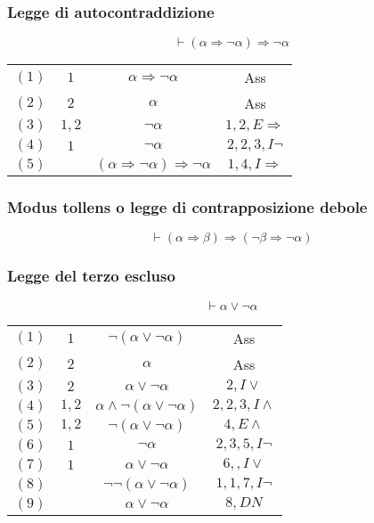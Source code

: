 \subsubsection{Legge di autocontraddizione}
\begin{equation}
\vdash(\alpha\Rightarrow\neg\alpha)\Rightarrow\neg\alpha
\end{equation}
\begin{tabular}{c c c c}
$(1)$& $1$ & $\alpha\Rightarrow\neg\alpha$ & Ass\\
$(2)$& $2$ & $\alpha$ & Ass\\
$(3)$ & $1, 2$ & $\neg\alpha$& $1,2, E\Rightarrow$\\
$(4)$ & $1$ & $\neg\alpha$ & $2,2, 3, I\neg$\\
$(5)$ &  & $(\alpha\Rightarrow\neg\alpha)\Rightarrow\neg\alpha$ & $1,4,I\Rightarrow$\\
\end{tabular}
\subsubsection{Modus tollens o legge di contrapposizione debole}
\begin{equation}
\vdash (\alpha\Rightarrow\beta)\Rightarrow(\neg\beta\Rightarrow\neg\alpha)
\end{equation}
\subsubsection{Legge del terzo escluso}
\begin{equation}
\vdash \alpha\lor\neg\alpha
\end{equation}
\begin{tabular}{c c c c}
$(1)$& $1$ & $\neg(\alpha\lor\neg\alpha)$ & Ass\\
$(2)$& $2$ & $\alpha$ & Ass\\
$(3)$ & $2$ & $\alpha\lor\neg\alpha$& $2, I\lor$\\
$(4)$ & $1, 2$ & $\alpha\land\neg(\alpha\lor\neg\alpha)$ & $2,2, 3, I\land$\\
$(5)$ &  $1, 2$& $\neg(\alpha\lor\neg\alpha)$ & $4,E\land$\\
$(6)$ & $1$ & $\neg\alpha$ & $2,3,5,I\neg$\\
$(7)$ & $1$ & $\alpha\lor\neg\alpha$ & $6, ,I\lor$\\
$(8)$ &  & $\neg\neg(\alpha\lor\neg\alpha)$ & $1,1,7,I\neg$\\
$(9)$ &  & $\alpha\lor\neg\alpha$ & $8, DN$\\
\end{tabular}
